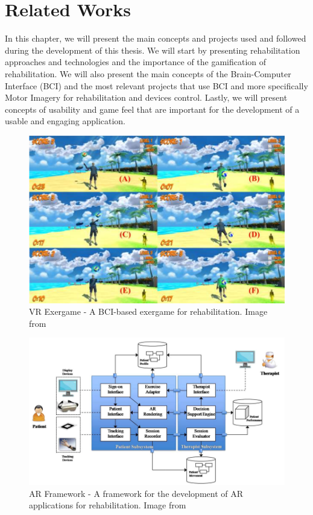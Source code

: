 \chapter{Related Works}\label{ch:related_works}
In this chapter, we will present the main concepts and projects used and followed during the development of this thesis. 
We will start by presenting rehabilitation approaches and technologies and the importance of the gamification of rehabilitation. 
We will also present the main concepts of the Brain-Computer Interface (BCI) and the most relevant projects that use BCI and more specifically Motor Imagery for rehabilitation and devices control.
Lastly, we will present concepts of usability and game feel that are important for the development of a usable and engaging application.

\begin{figure}[htbp!]
    \centering
    \includegraphics[width=\textwidth]{Figures/Related/ave_exergame}
    \caption{VR Exergame - A BCI-based exergame for rehabilitation. Image from~\cite{trombetta}}\label{fig:exergame}
\end{figure}

\begin{figure}[htbp!]
    \centering
    \includegraphics[width=\textwidth]{Figures/Related/ar_app_framework}
    \caption{AR Framework - A framework for the development of AR applications for rehabilitation. Image from~\cite{5567156}}\label{fig:ar_app_framework}
\end{figure}

